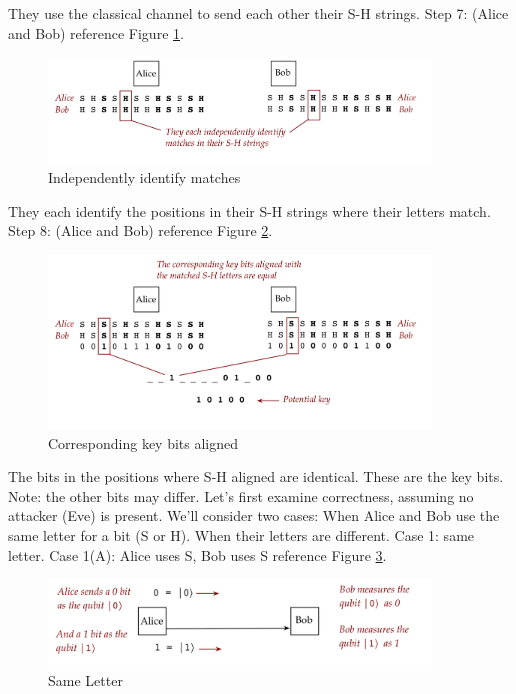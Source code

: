 \documentclass[main.tex]{subfiles}
\begin{document}
    They use the classical channel to send each other their S-H strings. Step 7: (Alice and Bob) reference Figure \ref{fig:40bb8}.

    \begin{figure}
        \centering
        \includegraphics[width=4in]{notes/figs/n05/40bb8.png}
        \caption{Independently identify matches}
        \label{fig:40bb8}
    \end{figure}  
    
    They each identify the positions in their S-H strings where their letters match. Step 8: (Alice and Bob) reference Figure \ref{fig:41bb9}.
    
    \begin{figure}
        \centering
        \includegraphics[width=4in]{notes/figs/n05/41bb9.png}
        \caption{Corresponding key bits aligned}
        \label{fig:41bb9}
    \end{figure} 
    
    The bits in the positions where S-H aligned are identical. These are the key bits. Note: the other bits may differ. Let's first examine correctness, assuming no attacker (Eve) is present. We'll consider two cases: When Alice and Bob use the same letter for a bit (S or H). When their letters are different. Case 1: same letter. Case 1(A): Alice uses S, Bob uses S reference Figure \ref{fig:42bb10}.
    
    \begin{figure}
        \centering
        \includegraphics[width=4in]{notes/figs/n05/42bb10.png}
        \caption{Same Letter}
        \label{fig:42bb10}
    \end{figure} 
    
\end{document}
